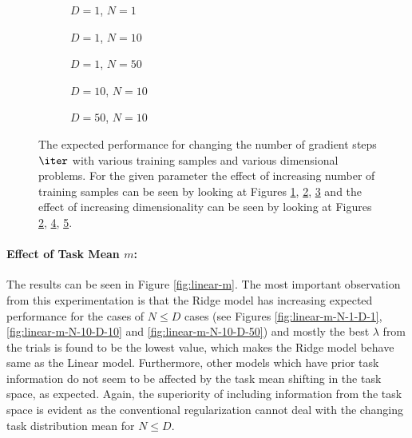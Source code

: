 \begin{figure}[h!]
  \centering
    \begin{subfigure}{0.3\textwidth}
      \centering
      \caption{$D=1$, $N=1$}
      \label{fig:linear-n_iter-N-1-D-1}
    \end{subfigure}
    \begin{subfigure}{0.3\textwidth}
      \centering
      \caption{$D=1$, $N=10$}
      \label{fig:linear-n_iter-N-10-D-1}
    \end{subfigure}
    \begin{subfigure}{0.3\textwidth}
      \centering
      \caption{$D=1$, $N=50$}
      \label{fig:linear-n_iter-N-50-D-1}
    \end{subfigure}

    \begin{subfigure}{0.3\textwidth}
      \centering
      \caption{$D=10$, $N=10$}
      \label{fig:linear-n_iter-N-10-D-10}
    \end{subfigure}
    \begin{subfigure}{0.3\textwidth}
      \centering
      \caption{$D=50$, $N=10$}
      \label{fig:linear-n_iter-N-10-D-50}
    \end{subfigure}  

  \caption{The expected performance for changing the number of gradient steps $\iter$ with various training samples and various dimensional problems. For the given parameter the effect of increasing number of training samples can be seen by looking at Figures \ref{fig:linear-n_iter-N-1-D-1}, \ref{fig:linear-n_iter-N-10-D-1}, \ref{fig:linear-n_iter-N-50-D-1} and the effect of increasing dimensionality can be seen by looking at Figures \ref{fig:linear-n_iter-N-10-D-1}, \ref{fig:linear-n_iter-N-10-D-10}, \ref{fig:linear-n_iter-N-10-D-50}.}\label{fig:linear-n_iter}
\end{figure}


\paragraph{Effect of Task Mean $m$:} The results can be seen in Figure \ref{fig:linear-m}. The most important observation from this experimentation is that the Ridge model has increasing expected performance for the cases of $N\leq D$ cases (see Figures \ref{fig:linear-m-N-1-D-1}, \ref{fig:linear-m-N-10-D-10} and \ref{fig:linear-m-N-10-D-50}) and mostly the best $\lambda$ from the trials is found to be the lowest value, which makes the Ridge model behave same as the Linear model. Furthermore, other models which have prior task information do not seem to be affected by the task mean shifting in the task space, as expected. Again, the superiority of including information from the task space is evident as the conventional regularization cannot deal with the changing task distribution mean for $N\leq D$.

